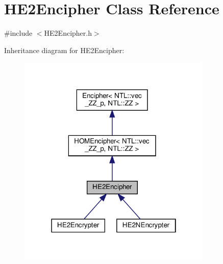 \hypertarget{classHE2Encipher}{}\section{H\+E2\+Encipher Class Reference}
\label{classHE2Encipher}


{\ttfamily \#include $<$H\+E2\+Encipher.\+h$>$}



Inheritance diagram for H\+E2\+Encipher\+:
\nopagebreak
\begin{figure}[H]
\begin{center}
\leavevmode
\includegraphics[width=262pt]{classHE2Encipher__inherit__graph}
\end{center}
\end{figure}


